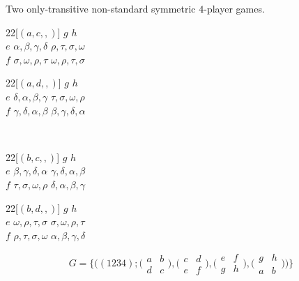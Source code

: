 \begin{example} \label{OTNSeg}
Two only-transitive non-standard symmetric $4$-player games.
\begin{center}
  \begin{game}{2}{2}[$(a,c,,)$]
       \>  $g$          \>  $h$          \\
    $e$  \>  $\alpha,\beta,\gamma,\delta$  \>  $\rho,\tau,\sigma,\omega$  \\
    $f$  \>  $\sigma,\omega,\rho,\tau$  \>  $\omega,\rho,\tau,\sigma$  
  \end{game}
  \hspace*{5mm}
  \begin{game}{2}{2}[$(a,d,,)$]
       \>  $g$          \>  $h$          \\
    $e$  \>  $\delta,\alpha,\beta,\gamma$  \>  $\tau,\sigma,\omega,\rho$  \\
    $f$  \>  $\gamma,\delta,\alpha,\beta$  \>  $\beta,\gamma,\delta,\alpha$  
  \end{game}
  \\
  \begin{game}{2}{2}[$(b,c,,)$]
       \>  $g$          \>  $h$          \\
    $e$  \>  $\beta,\gamma,\delta,\alpha$  \>  $\gamma,\delta,\alpha,\beta$  \\
    $f$  \>  $\tau,\sigma,\omega,\rho$  \>  $\delta,\alpha,\beta,\gamma$  
  \end{game}
  \hspace*{5mm}
  \begin{game}{2}{2}[$(b,d,,)$]
       \>  $g$          \>  $h$          \\
    $e$  \>  $\omega,\rho,\tau,\sigma$  \>  $\sigma,\omega,\rho,\tau$  \\
    $f$  \>  $\rho,\tau,\sigma,\omega$  \>  $\alpha,\beta,\gamma,\delta$  
  \end{game}
\end{center}

\[ G = \{ \bigl((1234) ; \bigl(\begin{smallmatrix} a & b \\ d & c \end{smallmatrix}\bigr), \bigl(\begin{smallmatrix} c & d \\ e & f \end{smallmatrix}\bigr), \bigl(\begin{smallmatrix} e & f \\ g & h \end{smallmatrix}\bigr), \bigl(\begin{smallmatrix} g & h \\ a & b \end{smallmatrix}\bigr)\bigr)\} \]


\end{example}
